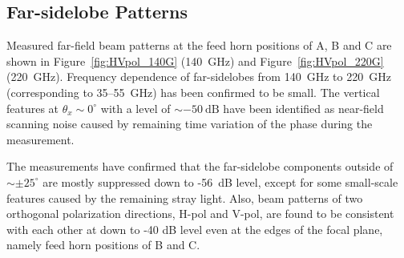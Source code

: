 \documentclass[journal]{IEEEtran}
\begin{document}
\subsection{Far-sidelobe Patterns}
%
Measured far-field beam patterns at the feed horn positions of A, B and C are shown in Figure~\ref{fig:HVpol_140G} (140~GHz) and Figure~\ref{fig:HVpol_220G} (220~GHz). 
Frequency dependence of far-sidelobes from 140~GHz to 220~GHz (corresponding to 35--55~GHz) has been confirmed to be small.
The vertical features at $\theta_x \sim 0^\circ$ with a level of $\sim -50~\mathrm{dB}$ have been identified as near-field scanning noise caused by remaining time variation of the phase during the measurement. 
\par
The measurements have confirmed that the far-sidelobe components outside of $\sim \pm25^\circ$ are mostly suppressed down to -56~dB level, except for some small-scale features caused by the remaining stray light. Also, beam patterns of two orthogonal polarization directions, H-pol and V-pol, are found to be consistent with each other at down to -40 dB level even at the edges of the focal plane, namely feed horn positions of B and C.
%
\end{document}
